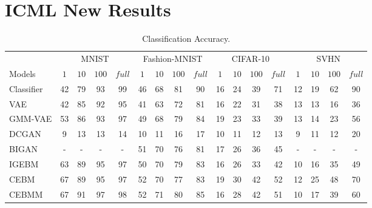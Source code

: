 \newpage
\section{ICML New Results}
\begin{table}[!h]
\caption{Classification Accuracy. }
\centering
\begin{tabular}{l|cccc|cccc|cccc|cccc}
\toprule
 & \multicolumn{4}{c}{MNIST} & \multicolumn{4}{|c}{Fashion-MNIST} & \multicolumn{4}{|c}{CIFAR-10} & \multicolumn{4}{|c}{SVHN}\\
Models & $1$ & $10$  & $100$ & $full$ & $1$ & $10$  & $100$ & $full$ & $1$ & $10$  & $100$ & $full$ & $1$ & $10$  & $100$ & $full$ \\
\midrule
\midrule
Classifier & 42 & 79 & 93 & 99 & 46 & 68 & 81 & 90 & 16 & 24 & 39 & 71 & 12 & 19 & 62 & 90\\
\midrule
VAE & 42 & 85 & 92 & 95 & 41 & 63 & 72 & 81 & 16 & 22 & 31 & 38 & 13 & 13 & 16 & 36\\
GMM-VAE & 53 & 86 & 93 & 97 & 49 & 68 & 79 & 84 & 19 & 23 & 33 & 39 & 13 & 14 & 23 & 56  \\
DCGAN & 9 & 13 & 13 & 14 & 10 & 11 & 16 & 17 & 10 & 11 & 12 & 13 & 9 & 11 & 12 & 20 \\
BIGAN & - & - & - & - & 51 & 70 & 76 & 81 & 17 & 26 & 36 & 45 & - & - & - & -  \\ 
\midrule
IGEBM & 63 & 89 & 95 & 97 & 50 & 70 & 79 & 83 & 16 & 26 & 33 & 42 & 10 & 16 & 35 & 49\\
CEBM & 67 & 89 & 95 & 97 & 52 & 70 & 77 & 83 & 19 & 30 & 42 & 52 & 12 & 25 & 48 & 70 \\
CEBMM & 67 & 91 & 97 & 98 & 52 & 71 & 80 & 85 & 16 & 28 & 42 & 51 & 10 & 17 & 39 & 60 \\
\bottomrule
\end{tabular}
\label{tab:few-shot classification-2}
\end{table}

